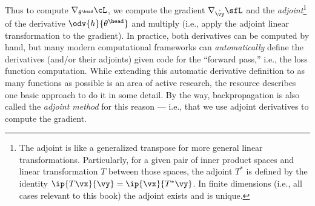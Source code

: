 \documentclass[../../book-main.tex]{subfiles}
\begin{document}
Thus to compute \(\nabla_{\theta^{\head}}\cL\), we compute the
gradient \(\nabla_{\hat{\vy}}\sfL\) and the
\textit{adjoint}\footnote{The adjoint is like a generalized transpose
    for more general linear transformations. Particularly, for a given
    pair of inner product spaces and linear transformation \(T\) between
    those spaces, the adjoint \(T^{*}\) is defined by the identity
    \(\ip{T\vx}{\vy} = \ip{\vx}{T^{*}\vy}\). In finite dimensions (i.e.,
all cases relevant to this book) the adjoint exists and is unique.}
of the derivative \(\odv{h}{\theta^{\head}}\) and multiply (i.e.,
apply the adjoint linear transformation to the gradient). In
practice, both derivatives can be computed by hand, but many modern
computational frameworks can \textit{automatically} define the
derivatives (and/or their adjoints) given code for the ``forward
pass,'' i.e., the loss function computation. While extending this
automatic derivative definition to as many functions as possible is
an area of active research, the resource \cite{bright2025matrix}
describes one basic approach to do it in some detail. By the way,
backpropagation is also called the \textit{adjoint method} for this
reason --- i.e., that we use adjoint derivatives to compute the gradient.
\end{document}

